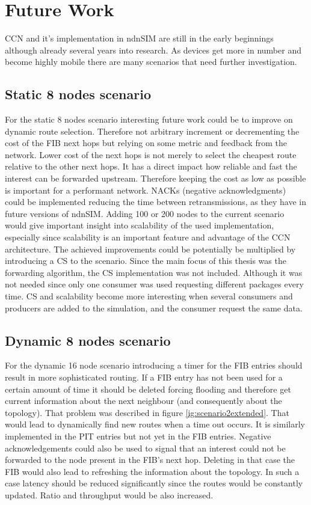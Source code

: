 \section{Future Work}

CCN and it's implementation in ndnSIM are still in the early beginnings although already several years into research. As devices get more in number and become highly mobile there are many scenarios that need further investigation.

\subsection{Static 8 nodes scenario}

For the static 8 nodes scenario interesting future work could be to improve on dynamic route selection. Therefore not arbitrary increment or decrementing the cost of the FIB next hops but relying on some metric and feedback from the network. Lower cost of the next hops is not merely to select the cheapest route relative to the other next hops. It has a direct impact how reliable and fast the interest can be forwarded upstream. Therefore keeping the cost as low as possible is important for a performant network. NACKs (negative acknowledgments) could be implemented reducing the time between retransmissions, as they have in future versions of ndnSIM. Adding 100 or 200 nodes to the current scenario would give important insight into scalability of the used implementation, especially since scalability is an important feature and advantage of the CCN architecture. The achieved improvements could be potentially be multiplied by introducing a CS to the scenario. Since the main focus of this thesis was the forwarding algorithm, the CS implementation was not included. Although it was not needed since only one consumer was used requesting different packages every time. CS and scalability become more interesting when several consumers and producers are added to the simulation, and the consumer request the same data.

\subsection{Dynamic 8 nodes scenario}

For the dynamic 16 node scenario introducing a timer for the FIB entries should result in more sophisticated routing. If a FIB entry has not been used for a certain amount of time it should be deleted forcing flooding and therefore get current information about the next neighbour (and consequently about the topology). That problem was described in figure \ref{ig:scenario2extended}. That would lead to dynamically find new routes when a time out occurs. It is similarly implemented in the PIT entries but not yet in the FIB entries. Negative acknowledgements could also be used to signal that an interest could not be forwarded to the node present in the FIB's next hop. Deleting in that case the FIB would also lead to refreshing the information about the topology. In such a case latency should be reduced significantly since the routes would be constantly updated. Ratio and throughput would be also increased.






